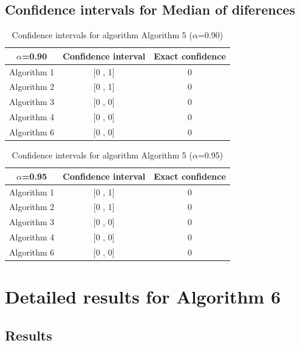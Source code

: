 \documentclass[a4paper,10pt]{article}
\begin{document}
\subsection{Confidence intervals for Median of diferences}

\begin{table}[!htp]
\centering\small
\begin{tabular}{
|c|c|c|}
\hline
 $\alpha$=0.90 & Confidence interval & Exact confidence \\ \hline 
Algorithm 1 & [0 , 1] & 0\\ \hline 
Algorithm 2 & [0 , 1] & 0\\ \hline 
Algorithm 3 & [0 , 0] & 0\\ \hline 
Algorithm 4 & [0 , 0] & 0\\ \hline 
Algorithm 6 & [0 , 0] & 0\\ \hline 

\end{tabular}
\caption{Confidence intervals for algorithm Algorithm 5 ($\alpha$=0.90)}
\end{table}
\begin{table}[!htp]
\centering\small
\begin{tabular}{
|c|c|c|}
\hline
 $\alpha$=0.95 & Confidence interval & Exact confidence \\ \hline 
Algorithm 1 & [0 , 1] & 0\\ \hline 
Algorithm 2 & [0 , 1] & 0\\ \hline 
Algorithm 3 & [0 , 0] & 0\\ \hline 
Algorithm 4 & [0 , 0] & 0\\ \hline 
Algorithm 6 & [0 , 0] & 0\\ \hline 

\end{tabular}
\caption{Confidence intervals for algorithm Algorithm 5 ($\alpha$=0.95)}
\end{table}

 \clearpage 


\section{Detailed results for Algorithm 6}


\subsection{Results}
\end{document}
